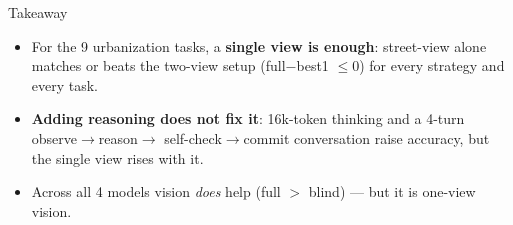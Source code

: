 \documentclass[aspectratio=169]{beamer}
\begin{document}
\begin{frame}{Takeaway}
\begin{itemize}
  \item For the 9 urbanization tasks, a \textbf{single view is enough}: street-view alone matches or
        beats the two-view setup (full$-$best1 $\leq 0$) for every strategy and every task.
  \item \textbf{Adding reasoning does not fix it}: 16k-token thinking and a 4-turn observe$\to$reason$\to$
        self-check$\to$commit conversation raise accuracy, but the single view rises with it.
  \item Across all 4 models vision \emph{does} help (full $>$ blind) --- but it is one-view vision.
\end{itemize}
\end{frame}
\end{document}
